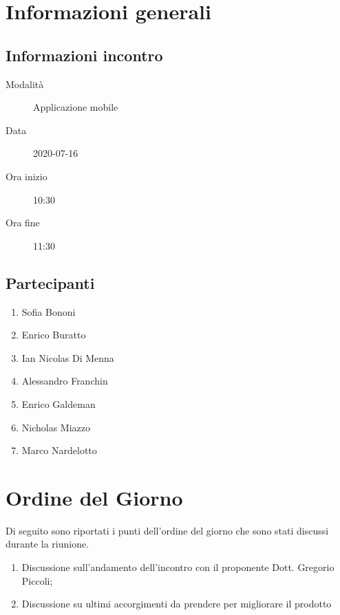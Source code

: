 \documentclass{article}
\begin{document}


\section{Informazioni generali}%
\label{sec:informazioni_generali}

\subsection{Informazioni incontro}%
\label{sub:informazioni_incontro}

\begin{description}
  \item[Modalità] Applicazione mobile 
  \item[Data] 2020-07-16
  \item[Ora inizio] 10:30
  \item[Ora fine] 11:30
\end{description}

\subsection{Partecipanti}%
\label{sub:partecipanti}

\begin{enumerate}
  \item Sofia Bononi
  \item Enrico Buratto
  \item Ian Nicolas Di Menna
  \item Alessandro Franchin
  \item Enrico Galdeman
  \item Nicholas Miazzo
  \item Marco Nardelotto
\end{enumerate}

\section{Ordine del Giorno}%
\label{ordine_del_giorno}
Di seguito sono riportati i punti dell'ordine del giorno che sono stati discussi durante la riunione.
\begin{enumerate}
  \item Discussione sull'andamento dell'incontro con il proponente Dott. Gregorio Piccoli;
  \item Discussione su ultimi accorgimenti da prendere per migliorare il prodotto
\end{enumerate}
\end{document}
